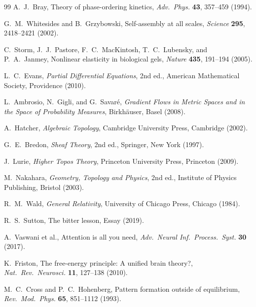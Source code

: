 \documentclass[11pt, a4paper, twocolumn]{article}
\begin{document}
{\begin{thebibliography}{99}
A.~J.~Bray,
\newblock Theory of phase-ordering kinetics,
\newblock \emph{Adv.\ Phys.} \textbf{43}, 357--459 (1994).

G.~M.~Whitesides and B.~Grzybowski,
\newblock Self-assembly at all scales,
\newblock \emph{Science} \textbf{295}, 2418--2421 (2002).

C.~Storm, J.~J.~Pastore, F.~C.~MacKintosh, T.~C.~Lubensky, and P.~A.~Janmey,
\newblock Nonlinear elasticity in biological gels,
\newblock \emph{Nature} \textbf{435}, 191--194 (2005).

L.~C.~Evans,
\newblock \emph{Partial Differential Equations}, 2nd ed.,
\newblock American Mathematical Society, Providence (2010).

L.~Ambrosio, N.~Gigli, and G.~Savar\'e,
\newblock \emph{Gradient Flows in Metric Spaces and in the Space of Probability
Measures},
\newblock Birkh\"auser, Basel (2008).

A.~Hatcher,
\newblock \emph{Algebraic Topology},
\newblock Cambridge University Press, Cambridge (2002).

G.~E.~Bredon,
\newblock \emph{Sheaf Theory}, 2nd ed.,
\newblock Springer, New York (1997).

J.~Lurie,
\newblock \emph{Higher Topos Theory},
\newblock Princeton University Press, Princeton (2009).

M.~Nakahara,
\newblock \emph{Geometry, Topology and Physics}, 2nd ed.,
\newblock Institute of Physics Publishing, Bristol (2003).

R.~M.~Wald,
\newblock \emph{General Relativity},
\newblock University of Chicago Press, Chicago (1984).

R.~S.~Sutton,
\newblock The bitter lesson,
\newblock Essay (2019).

A.~Vaswani et al.,
\newblock Attention is all you need,
\newblock \emph{Adv.\ Neural Inf.\ Process.\ Syst.} \textbf{30} (2017).

K.~Friston,
\newblock The free-energy principle: A unified brain theory?,
\newblock \emph{Nat.\ Rev.\ Neurosci.} \textbf{11}, 127--138 (2010).

M.~C.~Cross and P.~C.~Hohenberg,
\newblock Pattern formation outside of equilibrium,
\newblock \emph{Rev.\ Mod.\ Phys.} \textbf{65}, 851--1112 (1993).

\end{thebibliography}

} %
\end{document}
